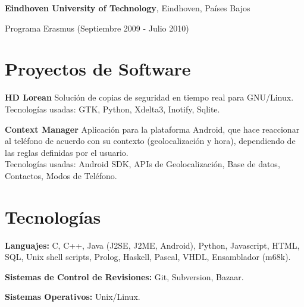 \documentclass[margin,line]{resume}
\begin{document}
\begin{resume}
{\bf Eindhoven University of Technology}, Eindhoven, Países Bajos\\
\vspace*{-.1in}
\begin{list1}
\item[] Programa Erasmus (Septiembre 2009 - Julio 2010)
\end{list1}

\section{\sc Proyectos de Software } 
\begin{list1}
\item[] {\bf HD Lorean}
Solución de copias de seguridad en tiempo real para GNU/Linux.\\
Tecnologías usadas: GTK, Python, Xdelta3, Inotify, Sqlite.\\

\item[] {\bf Context Manager}
Aplicación para la plataforma Android, que hace reaccionar al teléfono 
de acuerdo con su contexto (geolocalización y hora), dependiendo de las reglas definidas por el usuario.\\
Tecnologías usadas: Android SDK, APIs de Geolocalización, Base de datos,
Contactos, Modos de Teléfono.
\end{list1}

\section{\sc Tecnologías} 
\begin{list2}
\item {\bf Languajes:} C, C++, Java (J2SE, J2ME, Android), Python,
Javascript, HTML, SQL, Unix shell scripts, Prolog, Haskell, Pascal, VHDL,
Ensamblador (m68k).
\item {\bf Sistemas de Control de Revisiones:} Git, Subversion, Bazaar.
\item {\bf Sistemas Operativos:} Unix/Linux. 
\end{list2}


\end{resume}
\end{document}
